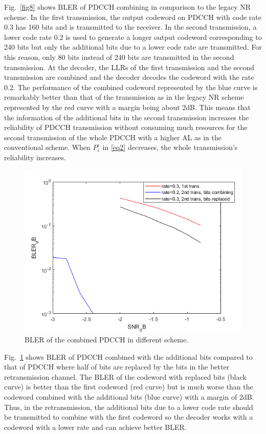 \documentclass[conference]{IEEEtran}
\begin{document}
Fig.~\ref{fig8} shows BLER of PDCCH combining in comparison to the legacy NR scheme. In the first transmission, the output codeword on PDCCH with code rate 0.3 has 160 bits and is transmitted to the receiver. In the second transmission, a lower code rate 0.2 is used to generate a longer output codeword corresponding to 240 bits but only the additional bits due to a lower code rate are transmitted. For this reason, only 80 bits instead of 240 bits are transmitted in the second transmission. At the decoder, the LLRs of the first transmission and the second transmission are combined and the decoder decodes the codeword with the rate 0.2. The performance of the combined codeword represented by the blue curve is remarkably better than that of the transmission as in the legacy NR scheme represented by the red curve with a margin being about 2dB. This means that the information of the additional bits in the second transmission increases the reliability of PDCCH transmission without consuming much resources for the second transmission of the whole PDCCH with a higher AL as in the conventional scheme. When $P^{e}_{c}$ in \eqref{eq2} decreases, the whole transmission's reliability increases.  

\begin{figure}[htbp]
\centerline{\includegraphics[scale=0.43]{fig9.png}}
\caption{BLER of the combined PDCCH in different scheme.}
\label{fig9}
\end{figure}

Fig.~\ref{fig9} shows BLER of PDCCH combined with the additional bits compared to that of PDCCH where half of bits are replaced by the bits in the better retransmission channel. The BLER of the codeword with replaced bits (black curve) is better than the first codeword (red curve) but is much worse than the codeword combined  with the additional bits (blue curve) with a margin of 2dB. Thus, in the retransmission, the additional bits due to a lower code rate should be transmitted to combine with the first codeword so the decoder works with a codeword with a lower rate and can achieve better BLER.
\end{document}
